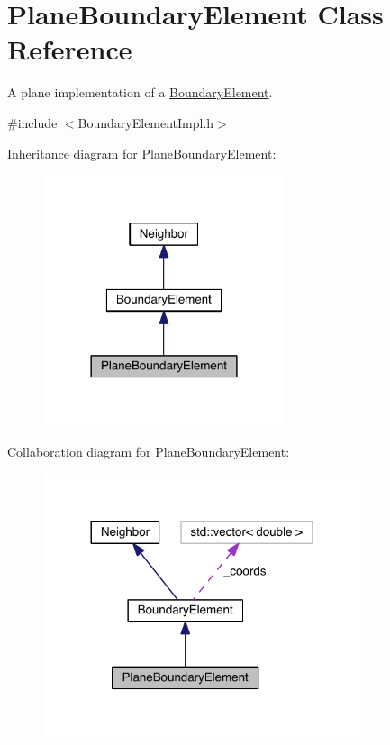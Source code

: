 \hypertarget{classPlaneBoundaryElement}{\section{Plane\+Boundary\+Element Class Reference}
\label{classPlaneBoundaryElement}
}


A plane implementation of a \hyperlink{classBoundaryElement}{Boundary\+Element}.  




{\ttfamily \#include $<$Boundary\+Element\+Impl.\+h$>$}



Inheritance diagram for Plane\+Boundary\+Element\+:
\nopagebreak
\begin{figure}[H]
\begin{center}
\leavevmode
\includegraphics[width=201pt]{classPlaneBoundaryElement__inherit__graph}
\end{center}
\end{figure}


Collaboration diagram for Plane\+Boundary\+Element\+:
\nopagebreak
\begin{figure}[H]
\begin{center}
\leavevmode
\includegraphics[width=264pt]{classPlaneBoundaryElement__coll__graph}
\end{center}
\end{figure}
